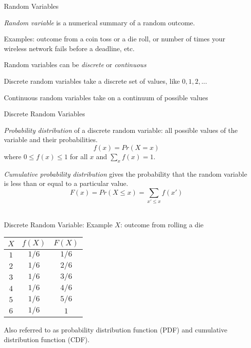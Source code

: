 \documentclass{./../div_teaching_slides}
\begin{document}
\begin{frame}{Random Variables}
\begin{witemize}
  \item \textit{Random variable} is a numerical summary of a random outcome. 
  \item Examples:  outcome from a coin toss or a die roll, or number of times your wireless network fails before a deadline, etc.
  \item Random variables can be \textit{discrete} or \textit{continuous}
  \item Discrete random variables take a discrete set of values, like $0, 1, 2,...$
  \item Continuous random variables take on a continuum of possible values
\end{witemize}
\end{frame}

\begin{frame}{Discrete Random Variables}
\begin{witemize}
  \item \textit{Probability distribution} of a discrete random variable: all possible values of the variable and their probabilities. 
$$ f(x) = Pr(X=x) $$
where $0 \leq f(x) \leq 1$ for all $x$ and $\sum_x f(x) = 1$.

\vspace{1em}
\item \textit{Cumulative probability distribution} gives the probability that the random variable is less than or equal to a particular value.
$$ F(x) = Pr(X \leq x) = \sum_{x' \leq x} f(x') $$ \\
\end{witemize}
\end{frame}

\begin{frame}{Discrete Random Variable: Example}
$X$: outcome from rolling a die	\\
\begin{center}
	\begin{tabular}{ccc}
$X$ & $f(X)$ & $F(X)$ \\
\hline
$1$ & $1/6$ & $1/6$\\
$2$ & $1/6$ & $2/6$ \\
$3$ & $1/6$ & $3/6$ \\
$4$ & $1/6$ & $4/6$ \\
$5$ & $1/6$ & $5/6$ \\
$6$ & $1/6$ & $1$\\
\end{tabular}
\end{center}
\vspace{0.5em}

Also referred to as probability distribution function (PDF) and cumulative distribution function (CDF).
\end{frame}
\end{document}
